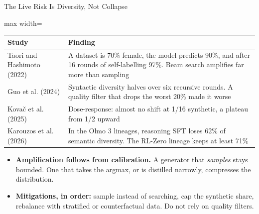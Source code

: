 \begin{frame}{The Live Risk Is Diversity, Not Collapse}
    \begin{center}
    \small
    \begin{adjustbox}{max width=\linewidth}\begin{tabular}{>{\raggedright\arraybackslash}p{3.4cm}>{\raggedright\arraybackslash}p{10.0cm}}
        \toprule
        \textbf{Study} & \textbf{Finding} \\
        \midrule
        Taori and Hashimoto (2022) & A dataset is 70\% female, the model predicts 90\%, and after 16 rounds of self-labelling 97\%. Beam search amplifies far more than sampling \\
        Guo et al. (2024) & Syntactic diversity halves over six recursive rounds. A quality filter that drops the worst 20\% \alert{made it worse} \\
        Kova\v{c} et al. (2025) & Dose-response: almost no shift at 1/16 synthetic, a plateau from 1/2 upward \\
        Karouzos et al. (2026) & In the Olmo 3 lineages, reasoning SFT loses 62\% of semantic diversity. The RL-Zero lineage keeps at least 71\% \\
        \bottomrule
    \end{tabular}\end{adjustbox}
    \end{center}
    \begin{itemize}\itemsep0.4em
        \item \textbf{Amplification follows from calibration.} A generator that \emph{samples} stays bounded. One that takes the argmax, or is distilled narrowly, compresses the distribution.
        \item \textbf{Mitigations, in order:} sample instead of searching, cap the synthetic share, rebalance with stratified or counterfactual data. Do not rely on quality filters.
    \end{itemize}
\end{frame}

